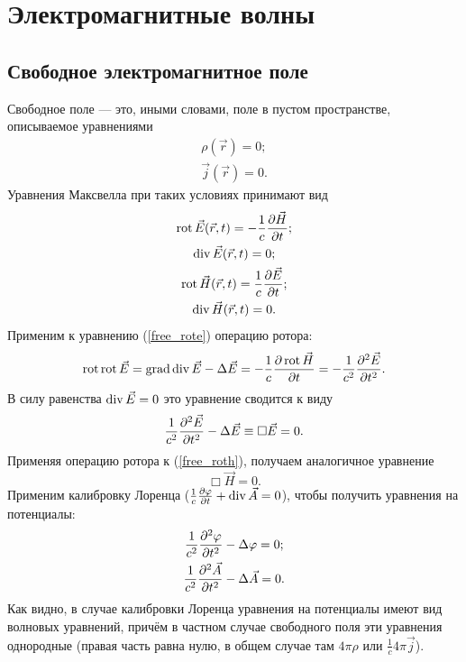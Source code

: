 \newpage
\section{Электромагнитные волны}
\subsection{Свободное электромагнитное поле}
    Свободное поле --- это, иными словами, поле в пустом пространстве, описываемое уравнениями
    \begin{gather*}
        \rho(\vec{r}) = 0; \\
        \vec{j}(\vec{r}) = 0.
    \end{gather*}
    Уравнения Максвелла при таких условиях принимают вид
    \begin{gather}
        \operatorname{rot}\vec{E}(\vec{r}, t) = -\frac 1c \frac{\partial\vec{H}}{\partial t}; \label{free_rote} \\
        \operatorname{div}\vec{E}(\vec{r}, t) = 0; \notag \\ 
        \operatorname{rot}\vec{H}(\vec{r}, t) = \frac 1c \frac{\partial\vec{E}}{\partial t}; \label{free_roth} \\
        \operatorname{div}\vec{H}(\vec{r}, t) = 0. \notag
    \end{gather}
    Применим к уравнению (\ref{free_rote}) операцию ротора:
    \[
        \operatorname{rot}\operatorname{rot}\vec{E} = \operatorname{grad}\operatorname{div}\vec{E} - \Delta\vec{E} = -\frac 1c \frac{\partial\operatorname{rot}\vec{H}}{\partial t}
        = -\frac 1{c^2}\frac{\partial^2\vec{E}}{\partial{t}^2}.
    \]
    В силу равенства $\operatorname{div}\vec{E} = 0$ это уравнение сводится к виду
    \[
        \frac 1{c^2} \frac{\partial^2\vec{E}}{\partial{t}^2} - \Delta\vec{E} \equiv \Box\vec{E} = 0.
    \]
    Применяя операцию ротора к (\ref{free_roth}), получаем аналогичное уравнение
    \[
        \Box\vec{H} = 0.
    \]
    Применим калибровку Лоренца ($\frac 1c \frac{\partial\varphi}{\partial t} + \operatorname{div}\vec{A} = 0$), чтобы получить уравнения на потенциалы:
    \begin{gather*}
        \frac 1{c^2} \frac{\partial^2\varphi}{\partial{t}^2} - \Delta\varphi = 0;\\
        \frac 1{c^2} \frac{\partial^2\vec{A}}{\partial{t}^2} - \Delta\vec{A} = 0.
    \end{gather*}
    Как видно, в случае калибровки Лоренца уравнения на потенциалы имеют вид волновых уравнений, причём в частном случае свободного поля
    эти уравнения однородные (правая часть равна нулю, в общем случае там $4\pi\rho$ или $\frac{1}{c}4\pi\vec{j}$).

